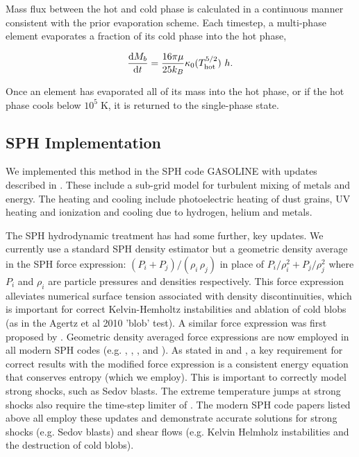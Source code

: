 Mass flux between the hot and cold phase is calculated in a continuous manner
consistent with the prior evaporation scheme.  Each timestep, a multi-phase
element evaporates a fraction of its cold phase into the hot phase,

\begin{equation}\label{multiphase_evaporation1}
    \frac{{\rm d}M_b}{{\rm d}t} = \frac{16\pi\mu}{25k_B} \kappa_0 (T_{\rm hot}^{5/2})\ h.
\end{equation}

Once an element has evaporated all of its mass into the hot phase, or if the hot
phase cools below $10^5\;\mathrm{K}$, it is returned to the single-phase state.

\subsection{SPH Implementation}

We implemented this method in the SPH code {\sc GASOLINE}
\citep{Wadsley2004} with updates described in \cite{Shen2010}.  These
include a sub-grid model for turbulent mixing of metals and energy.  The
heating and cooling include photoelectric heating of dust grains, UV heating
and ionization and cooling due to hydrogen, helium and metals.

The SPH hydrodynamic treatment has had some further, key updates.  We currently
use a standard SPH density estimator but a  geometric density average in the SPH
force expression: $(P_i+P_j)/(\rho_i\,\rho_j)$ in place of
$P_i/\rho_i^2+P_j/\rho_j^2$ where $P_i$ and $\rho_i$ are particle pressures and
densities respectively. This force expression alleviates numerical surface
tension associated with density discontinuities, which is important for correct
Kelvin-Hemholtz instabilities and ablation of cold blobs (as in the Agertz et al
2010 'blob' test).  A similar force expression was first proposed by
\citet{Ritchie2001}.  Geometric density averaged force expressions are now
employed in all modern SPH codes (e.g. \cite{Hopkins2013}, \cite{Saitoh2013},
\cite{Kawata2013}, \cite{Hu2014} and \cite{Read2010}).  As
stated in \cite{Read2010} and \cite{Saitoh2013}, a key requirement
for correct results with the modified force expression is a consistent energy
equation that conserves entropy (which we employ).  This is important to
correctly model strong shocks, such as Sedov blasts.  The extreme temperature
jumps at strong shocks also require the time-step limiter of \citet{Saitoh2009}.
The modern SPH code papers listed above all employ these updates and demonstrate
accurate solutions for strong shocks (e.g. Sedov blasts) and shear flows (e.g.
Kelvin Helmholz instabilities and the destruction of cold blobs).

